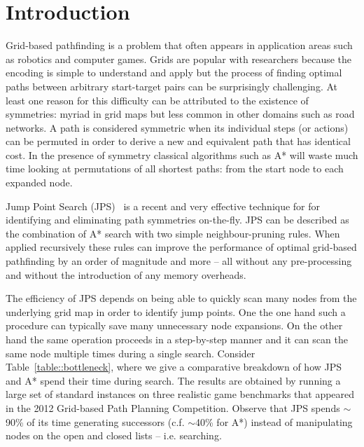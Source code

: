 \section{Introduction}
\label{sec::introduction}
Grid-based pathfinding is a problem that often
appears in application areas such as robotics and computer games. 
Grids are popular with researchers because the encoding is
simple to understand and apply but the process of finding optimal paths
between arbitrary start-target pairs can be surprisingly challenging. At least
one reason for this difficulty can be attributed to the existence of 
symmetries: myriad in grid maps but less common in other domains such as
road networks. A path is considered symmetric when its individual steps 
(or actions) can be permuted in order to derive a new and equivalent path
that has identical cost.
In the presence of symmetry classical algorithms such as A* will waste much 
time looking at permutations of all shortest paths: from the start node to each expanded node.

Jump Point Search (JPS)~\cite{harabor11b} is a recent and very effective 
technique for for identifying and eliminating path symmetries on-the-fly. 
JPS can be described as the combination of A* search with two simple 
neighbour-pruning rules. When applied recursively these rules
can improve the performance of optimal grid-based pathfinding by an order of 
magnitude and more -- all without any pre-processing and without the 
introduction of any memory overheads.



The efficiency of JPS depends on being able to quickly scan many nodes
from the underlying grid map in order to identify jump points.
One the one hand such a procedure can typically save many unnecessary
node expansions. On the other hand the same operation proceeds in a 
step-by-step manner and it can scan the same node multiple times during 
a single search. 
Consider Table~\ref{table::bottleneck}, where we give a comparative
breakdown of how JPS and A{*} spend their time during search.
The results are obtained by running
a large set of standard instances on three realistic game benchmarks
that appeared in the 2012 Grid-based Path Planning Competition. Observe that
JPS spends $\sim$90\% of its time generating successors (c.f. $\sim$40\% for
A{*}) instead of manipulating nodes on the open and closed lists -- i.e.
searching.

